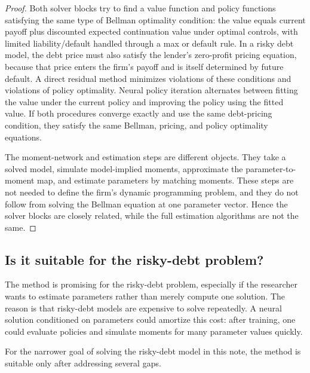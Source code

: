 \documentclass[11pt]{article}
\newcommand{\1}{\mathbf{1}}
\begin{document}
\begin{proof}
Both solver blocks try to find a value function and policy functions satisfying
the same type of Bellman optimality condition: the value equals current payoff
plus discounted expected continuation value under optimal controls, with
limited liability/default handled through a max or default rule. In a risky
debt model, the debt price must also satisfy the lender's zero-profit pricing
equation, because that price enters the firm's payoff and is itself determined
by future default. A direct residual method minimizes violations of these
conditions and violations of policy optimality. Neural policy iteration
alternates between fitting the value under the current policy and improving
the policy using the fitted value. If both procedures converge exactly and use
the same debt-pricing condition, they satisfy the same Bellman, pricing, and
policy optimality equations.

The moment-network and estimation steps are different objects. They take a
solved model, simulate model-implied moments, approximate the parameter-to-
moment map, and estimate parameters by matching moments. These steps are not
needed to define the firm's dynamic programming problem, and they do not follow
from solving the Bellman equation at one parameter vector. Hence the solver
blocks are closely related, while the full estimation algorithms are not the
same.
\end{proof}

\subsection{Is it suitable for the risky-debt problem?}

The method is promising for the risky-debt problem, especially if the researcher
wants to estimate parameters rather than merely compute one solution. The reason
is that risky-debt models are expensive to solve repeatedly. A neural solution
conditioned on parameters could amortize this cost: after training, one could
evaluate policies and simulate moments for many parameter values quickly.

For the narrower goal of solving the risky-debt model in this note, the method
is suitable only after addressing several gaps.
\end{document}
